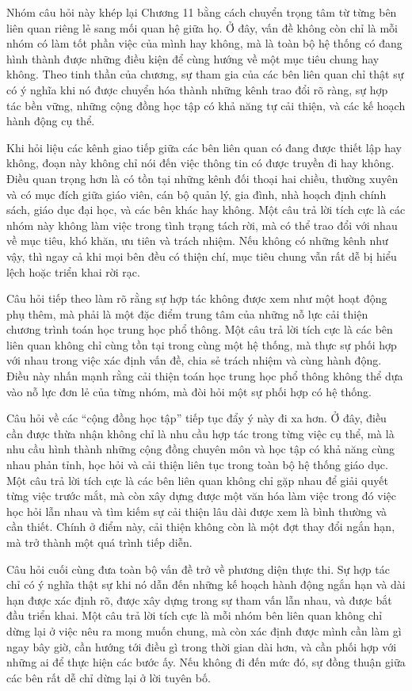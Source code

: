 \documentclass[
  10pt,
  a4paper,
  landscape,
  twoside,
  openany
]{scrbook}
\newcommand{\NOTE}[1]{#1}
\begin{document}
{
\NOTE{Nhóm câu hỏi này khép lại Chương 11 bằng cách chuyển trọng tâm từ từng bên liên quan riêng lẻ sang mối quan hệ giữa họ. Ở đây, vấn đề không còn chỉ là mỗi nhóm có làm tốt phần việc của mình hay không, mà là toàn bộ hệ thống có đang hình thành được những điều kiện để cùng hướng về một mục tiêu chung hay không. Theo tinh thần của chương, sự tham gia của các bên liên quan chỉ thật sự có ý nghĩa khi nó được chuyển hóa thành những kênh trao đổi rõ ràng, sự hợp tác bền vững, những cộng đồng học tập có khả năng tự cải thiện, và các kế hoạch hành động cụ thể.

Khi hỏi liệu các kênh giao tiếp giữa các bên liên quan có đang được thiết lập hay không, đoạn này không chỉ nói đến việc thông tin có được truyền đi hay không. Điều quan trọng hơn là có tồn tại những kênh đối thoại hai chiều, thường xuyên và có mục đích giữa giáo viên, cán bộ quản lý, gia đình, nhà hoạch định chính sách, giáo dục đại học, và các bên khác hay không. Một câu trả lời tích cực là các nhóm này không làm việc trong tình trạng tách rời, mà có thể trao đổi với nhau về mục tiêu, khó khăn, ưu tiên và trách nhiệm. Nếu không có những kênh như vậy, thì ngay cả khi mọi bên đều có thiện chí, mục tiêu chung vẫn rất dễ bị hiểu lệch hoặc triển khai rời rạc.

Câu hỏi tiếp theo làm rõ rằng sự hợp tác không được xem như một hoạt động phụ thêm, mà phải là một đặc điểm trung tâm của những nỗ lực cải thiện chương trình toán học trung học phổ thông. Một câu trả lời tích cực là các bên liên quan không chỉ cùng tồn tại trong cùng một hệ thống, mà thực sự phối hợp với nhau trong việc xác định vấn đề, chia sẻ trách nhiệm và cùng hành động. Điều này nhấn mạnh rằng cải thiện toán học trung học phổ thông không thể dựa vào nỗ lực đơn lẻ của từng nhóm, mà đòi hỏi một sự phối hợp có hệ thống.

Câu hỏi về các ``cộng đồng học tập'' tiếp tục đẩy ý này đi xa hơn. Ở đây, điều cần được thừa nhận không chỉ là nhu cầu hợp tác trong từng việc cụ thể, mà là nhu cầu hình thành những cộng đồng chuyên môn và học tập có khả năng cùng nhau phản tỉnh, học hỏi và cải thiện liên tục trong toàn bộ hệ thống giáo dục. Một câu trả lời tích cực là các bên liên quan không chỉ gặp nhau để giải quyết từng việc trước mắt, mà còn xây dựng được một văn hóa làm việc trong đó việc học hỏi lẫn nhau và tìm kiếm sự cải thiện lâu dài được xem là bình thường và cần thiết. Chính ở điểm này, cải thiện không còn là một đợt thay đổi ngắn hạn, mà trở thành một quá trình tiếp diễn.

Câu hỏi cuối cùng đưa toàn bộ vấn đề trở về phương diện thực thi. Sự hợp tác chỉ có ý nghĩa thật sự khi nó dẫn đến những kế hoạch hành động ngắn hạn và dài hạn được xác định rõ, được xây dựng trong sự tham vấn lẫn nhau, và được bắt đầu triển khai. Một câu trả lời tích cực là mỗi nhóm bên liên quan không chỉ dừng lại ở việc nêu ra mong muốn chung, mà còn xác định được mình cần làm gì ngay bây giờ, cần hướng tới điều gì trong thời gian dài hơn, và cần phối hợp với những ai để thực hiện các bước ấy. Nếu không đi đến mức đó, sự đồng thuận giữa các bên rất dễ chỉ dừng lại ở lời tuyên bố.

}}
\end{document}
